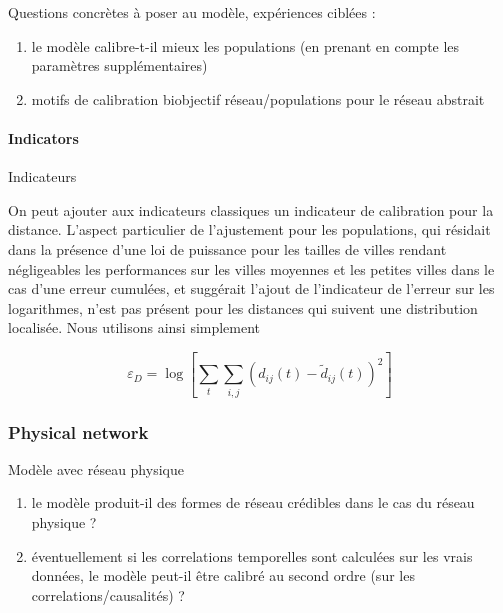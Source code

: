 Questions concrètes à poser au modèle, expériences ciblées : 

\begin{enumerate}
\item le modèle calibre-t-il mieux les populations (en prenant en compte les paramètres supplémentaires)
\item motifs de calibration biobjectif réseau/populations pour le réseau abstrait
\end{enumerate}



\paragraph{Indicators}{Indicateurs}

On peut ajouter aux indicateurs classiques un indicateur de calibration pour la distance. L'aspect particulier de l'ajustement pour les populations, qui résidait dans la présence d'une loi de puissance pour les tailles de villes rendant négligeables les performances sur les villes moyennes et les petites villes dans le cas d'une erreur cumulées, et suggérait l'ajout de l'indicateur de l'erreur sur les logarithmes, n'est pas présent pour les distances qui suivent une distribution localisée. Nous utilisons ainsi simplement

\[
\varepsilon_D = \log \left[ \sum_t \sum_{i,j} \left(d_{ij}(t) - \tilde{d}_{ij}(t)\right)^2\right]
\]



\subsubsection{Physical network}{Modèle avec réseau physique}


\begin{enumerate}
\item le modèle produit-il des formes de réseau crédibles dans le cas du réseau physique ?
\item éventuellement si les correlations temporelles sont calculées sur les vrais données, le modèle peut-il être calibré au second ordre (sur les correlations/causalités) ?
\end{enumerate}






